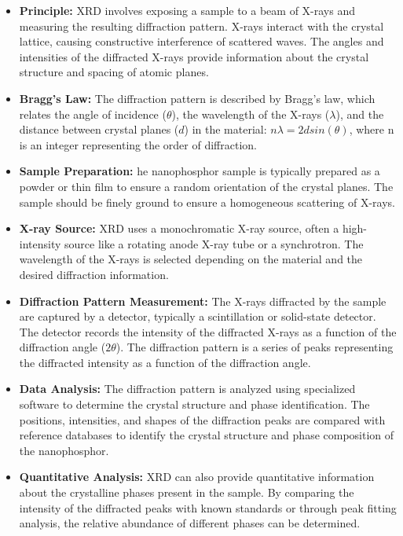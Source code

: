 \documentclass[../characterization.tex]{subfiles}
\begin{document}
    \begin{itemize}
        \item \textbf{Principle: } XRD involves exposing a sample to a beam of X-rays and measuring the resulting 
        diffraction pattern. X-rays interact with the crystal lattice, causing constructive interference of scattered 
        waves. The angles and intensities of the diffracted X-rays provide information about the crystal structure 
        and spacing of atomic planes.
        \item \textbf{Bragg's Law: }The diffraction pattern is described by Bragg's law, which relates the angle 
        of incidence ($\theta$), the wavelength of the X-rays ($\lambda$), and the distance between crystal planes 
        ($d$) in the material: $n{\lambda} = 2dsin(\theta)$, where n is an integer representing the order of 
        diffraction.
        \item \textbf{Sample Preparation: }he nanophosphor sample is typically prepared as a powder or thin film 
        to ensure a random orientation of the crystal planes. The sample should be finely ground to ensure a 
        homogeneous scattering of X-rays.
        \item \textbf{X-ray Source: }XRD uses a monochromatic X-ray source, often a high-intensity source like a 
        rotating anode X-ray tube or a synchrotron. The wavelength of the X-rays is selected depending on the 
        material and the desired diffraction information.
        \item \textbf{Diffraction Pattern Measurement: }The X-rays diffracted by the sample are captured by a 
        detector, typically a scintillation or solid-state detector. The detector records the intensity of the 
        diffracted X-rays as a function of the diffraction angle ($2\theta$). The diffraction pattern is a series 
        of peaks representing the diffracted intensity as a function of the diffraction angle.
        \item \textbf{Data Analysis: }The diffraction pattern is analyzed using specialized software to determine 
        the crystal structure and phase identification. The positions, intensities, and shapes of the diffraction 
        peaks are compared with reference databases to identify the crystal structure and phase composition of 
        the nanophosphor.
        \item \textbf{Quantitative Analysis: } XRD can also provide quantitative information about the crystalline 
        phases present in the sample. By comparing the intensity of the diffracted peaks with known standards or 
        through peak fitting analysis, the relative abundance of different phases can be determined.
    \end{itemize}
\end{document}
